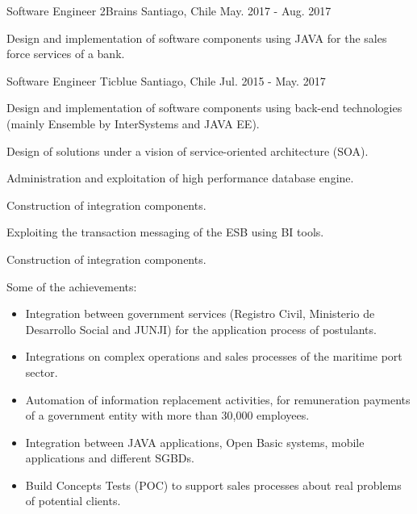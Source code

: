 \begin{cventries}
  \cventry
    {Software Engineer} %
    {2Brains} %
    {Santiago, Chile} %
    {May. 2017 - Aug. 2017} %
    {
      \begin{cvitems} %
        \item {Design and implementation of software components using JAVA for the sales force services of a bank.}
      \end{cvitems}
    }

  \cventry
    {Software Engineer} %
    {Ticblue} %
    {Santiago, Chile} %
    {Jul. 2015 - May. 2017} %
    {
      \begin{cvitems} %
        \item {Design and implementation of software components using back-end technologies (mainly Ensemble by InterSystems and JAVA EE).}
        \item {Design of solutions under a vision of service-oriented architecture (SOA).}
        \item {Administration and exploitation of high performance database engine.}
        \item {Construction of integration components.}
        \item {Exploiting the transaction messaging of the ESB using BI tools.}
        \item {Construction of integration components.}
        \item {Some of the achievements:}
        \begin{itemize}
        	\item{Integration between government services (Registro Civil, Ministerio de Desarrollo Social and JUNJI) for the application process of postulants.}
        	\item{Integrations on complex operations and sales processes of the maritime port sector.}
        	\item{Automation of information replacement activities, for remuneration payments of a government entity with more than 30,000 employees.}
        	\item{Integration between JAVA applications, Open Basic systems, mobile applications and different SGBDs.}
        	\item{Build Concepts Tests (POC) to support sales processes about real problems of potential clients.}        	
      	\end{itemize}
      \end{cvitems}
    }

\end{cventries}
